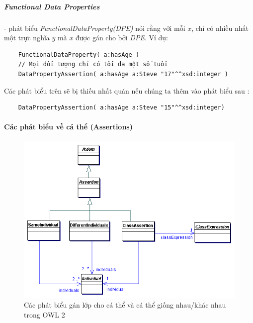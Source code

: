 	\subparagraph{Functional Data Properties} - phát biểu \textit{FunctionalDataProperty(DPE)} nói rằng với mỗi $x$, chỉ có nhiều nhất một trực nghĩa $y$ mà $x$ được gán cho bởi \textit{DPE}. Ví dụ:
	\begin{verbatim}
	FunctionalDataProperty( a:hasAge )
	// Mọi đối tượng chỉ có tối đa một số tuổi
	DataPropertyAssertion( a:hasAge a:Steve "17"^^xsd:integer )
	\end{verbatim}
	Các phát biểu trên sẽ bị thiếu nhất quán nếu chúng ta thêm vào phát biểu sau :
	\begin{verbatim}
	DataPropertyAssertion( a:hasAge a:Steve "15"^^xsd:integer)
	\end{verbatim}
	
	\paragraph{Các phát biểu về cá thể (Assertions)} 
	\begin{figure}[H]
		\centering
		\includegraphics[width=120mm]{Figures/abox1.png}
		\caption{Các phát biểu gán lớp cho cá thể và cá thể giống nhau/khác nhau trong OWL 2 \label{overflow}}
	\end{figure}
	
